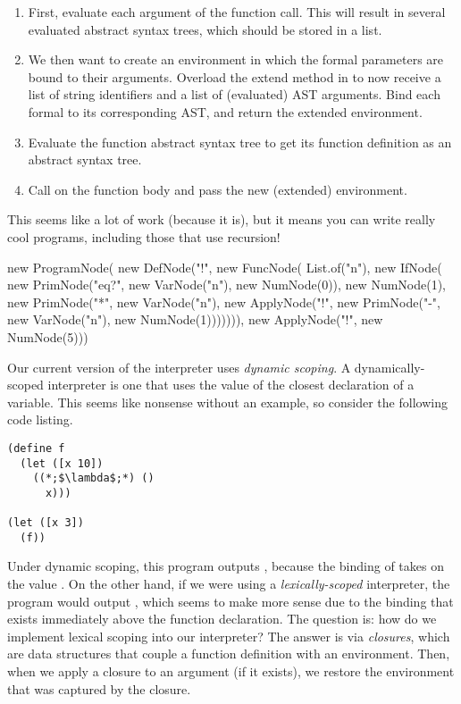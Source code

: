 \begin{enumerate}[label=(\alph*)]
  \begin{enumerate}[label=(\roman*)] 
  \item First, evaluate each argument of the function call. This will result in several evaluated abstract syntax trees, which should be stored in a list. 
  \item We then want to create an environment in which the formal parameters are bound to their arguments. Overload the extend method in  to now receive a list of string identifiers and a list of (evaluated) AST arguments. Bind each formal to its corresponding AST, and return the extended environment. 
  \item Evaluate the function abstract syntax tree to get its function definition as an abstract syntax tree.
  \item Call  on the function body and pass the new (extended) environment.
  \end{enumerate}
  This seems like a lot of work (because it is), but it means you can write really cool programs, including those that use recursion!
  \begin{verbnobox}[\small]
new ProgramNode(
  new DefNode("!", 
    new FuncNode(
      List.of("n"),
      new IfNode(
        new PrimNode("eq?", 
          new VarNode("n"), 
          new NumNode(0)),
        new NumNode(1),
        new PrimNode("*", 
          new VarNode("n"), 
          new ApplyNode("!", 
            new PrimNode("-", 
            new VarNode("n"), 
            new NumNode(1))))))),
  new ApplyNode("!", new NumNode(5)))
\end{verbnobox}
\end{enumerate}

Our current version of the interpreter uses \textit{dynamic scoping}. A dynamically-scoped interpreter is one that uses the value of the closest declaration of a variable. This seems like nonsense without an example, so consider the following code listing.
\begin{lstlisting}[language=MyScheme, frame=single]
(define f
  (let ([x 10])
    ((*;$\lambda$;*) ()
      x)))

(let ([x 3])
  (f))
\end{lstlisting}

Under dynamic scoping, this program outputs , because the binding of  takes on the value . On the other hand, if we were using a \textit{lexically-scoped} interpreter, the program would output , which seems to make more sense due to the binding that exists immediately above the function declaration. The question is: how do we implement lexical scoping into our interpreter? The answer is via \textit{closures}, which are data structures that couple a function definition with an environment. Then, when we apply a closure to an argument (if it exists), we restore the environment that was captured by the closure. 

